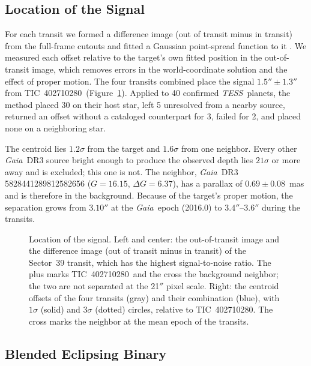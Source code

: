 \documentclass[twocolumn,linenumbers]{aastex701}
\newcommand{\tic}{TIC~402710280}
\newcommand{\tess}{\textit{TESS}}
\newcommand{\gaia}{\textit{Gaia}}
\begin{document}
\subsection{Location of the Signal} \label{sec:centroid}

For each transit we formed a difference image (out of transit minus in transit) from the full-frame cutouts and fitted a Gaussian point-spread function to it \citep[cf.][]{Bryson2013, Twicken2018}. We measured each offset relative to the target's own fitted position in the out-of-transit image, which removes errors in the world-coordinate solution and the effect of proper motion. The four transits combined place the signal $1.5'' \pm 1.3''$ from \tic\ (Figure~\ref{fig:diff}). Applied to 40 confirmed \tess\ planets, the method placed 30 on their host star, left 5 unresolved from a nearby source, returned an offset without a cataloged counterpart for 3, failed for 2, and placed none on a neighboring star.

The centroid lies $1.2\sigma$ from the target and $1.6\sigma$ from one neighbor. Every other \gaia\ DR3 source bright enough to produce the observed depth lies $21\sigma$ or more away and is excluded; this one is not. The neighbor, \gaia\ DR3 5828441289812582656 ($G = 16.15$, $\Delta G = 6.37$), has a parallax of $0.69 \pm 0.08$~mas and is therefore in the background. Because of the target's proper motion, the separation grows from $3.10''$ at the \gaia\ epoch (2016.0) to $3.4''$--$3.6''$ during the transits.

\begin{figure}
\caption{Location of the signal. Left and center: the out-of-transit image and the difference image (out of transit minus in transit) of the Sector~39 transit, which has the highest signal-to-noise ratio. The plus marks \tic\ and the cross the background neighbor; the two are not separated at the 21$''$ pixel scale. Right: the centroid offsets of the four transits (gray) and their combination (blue), with $1\sigma$ (solid) and $3\sigma$ (dotted) circles, relative to \tic. The cross marks the neighbor at the mean epoch of the transits.\label{fig:diff}}
\end{figure}

\subsection{Blended Eclipsing Binary} \label{sec:blend}
\end{document}
